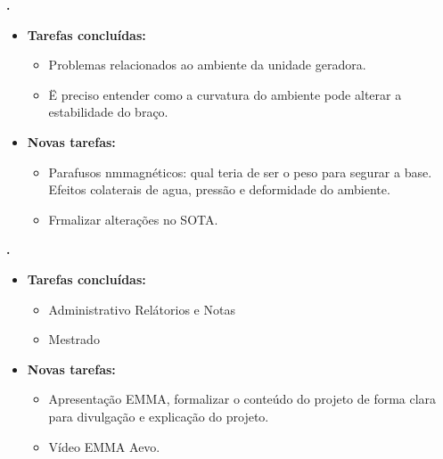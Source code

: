 \textbf{\gabriel.} 
	\begin{itemize}
		\item \textbf{Tarefas concluídas:}
			\begin{itemize}    
				\item Problemas relacionados ao ambiente da unidade geradora.
				\item Ë preciso entender como a curvatura do ambiente pode alterar a
				estabilidade do braço.
			\end{itemize}
		\item \textbf{Novas tarefas:}
			\begin{itemize}
				\item Parafusos nmmagnéticos: qual teria de ser o peso para segurar a base.
				Efeitos colaterais de agua, pressão e deformidade do ambiente.
				\item Frmalizar alterações no SOTA.		
			\end{itemize}
	\end{itemize}
	
\textbf{\julia.} 
	\begin{itemize}
		\item \textbf{Tarefas concluídas:}
			\begin{itemize}    
				\item Administrativo Relátorios e Notas
				\item Mestrado 
			\end{itemize}
		\item \textbf{Novas tarefas:}
			\begin{itemize}
				\item Apresentação EMMA, formalizar o conteúdo do projeto de
				forma clara para divulgação e explicação do projeto.
				\item Vídeo EMMA Aevo.
			\end{itemize}
	\end{itemize}

